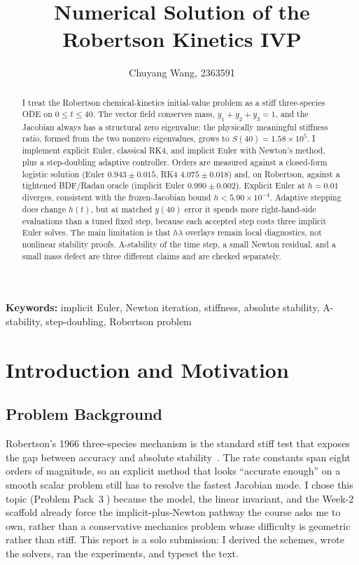 \documentclass[11pt,a4paper]{article}
\title{\textbf{Numerical Solution of the Robertson Kinetics IVP}}
\author{Chuyang Wang, 2363591}
\date{}
\begin{document}
\maketitle

\begin{abstract}
I treat the Robertson chemical-kinetics initial-value problem as a stiff three-species ODE on \(0\le t\le 40\). The vector field conserves mass, \(y_1+y_2+y_3=1\), and the Jacobian always has a structural zero eigenvalue; the physically meaningful stiffness ratio, formed from the two nonzero eigenvalues, grows to \(S(40)=1.58\times 10^5\). I implement explicit Euler, classical RK4, and implicit Euler with Newton's method, plus a step-doubling adaptive controller. Orders are measured against a closed-form logistic solution (Euler \(0.943\pm 0.015\), RK4 \(4.075\pm 0.018\)) and, on Robertson, against a tightened BDF/Radau oracle (implicit Euler \(0.990\pm 0.002\)). Explicit Euler at \(h=0.01\) diverges, consistent with the frozen-Jacobian bound \(h<5.90\times 10^{-4}\). Adaptive stepping does change \(h(t)\), but at matched \(y(40)\) error it spends more right-hand-side evaluations than a tuned fixed step, because each accepted step costs three implicit Euler solves. The main limitation is that \(h\lambda\) overlays remain local diagnostics, not nonlinear stability proofs. A-stability of the time step, a small Newton residual, and a small mass defect are three different claims and are checked separately.
\end{abstract}

\noindent\textbf{Keywords:} implicit Euler, Newton iteration, stiffness, absolute stability, A-stability, step-doubling, Robertson problem

\tableofcontents

\section{Introduction and Motivation}
\subsection{Problem Background}
Robertson's 1966 three-species mechanism is the standard stiff test that exposes the gap between accuracy and absolute stability~\cite{robertson1966,hairer1996}. The rate constants span eight orders of magnitude, so an explicit method that looks ``accurate enough'' on a smooth scalar problem still has to resolve the fastest Jacobian mode. I chose this topic (Problem Pack~\textcircled{3}) because the model, the linear invariant, and the Week-2 scaffold already force the implicit-plus-Newton pathway the course asks me to own, rather than a conservative mechanics problem whose difficulty is geometric rather than stiff. This report is a solo submission: I derived the schemes, wrote the solvers, ran the experiments, and typeset the text.
\end{document}
